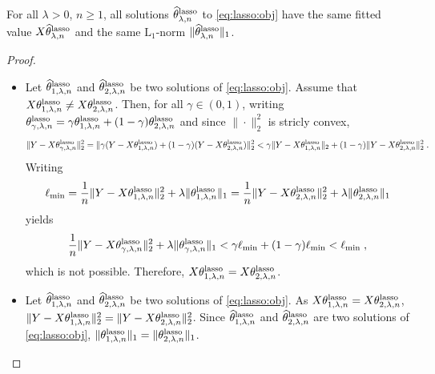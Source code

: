 \begin{lemma}
\label{lem:lasso:loss}
For all $\lambda>0$, $n\geqslant 1$, all solutions $\widehat {\theta}^{\mathrm{lasso}}_{\lambda,n}$ to \eqref{eq:lasso:obj} have the same fitted value $X \widehat {\theta}^{\mathrm{lasso}}_{\lambda,n}$ and the same $\mathrm{L}_1$-norm $\|\widehat {\theta}^{\mathrm{lasso}}_{\lambda,n}\|_1$.
\end{lemma}

\begin{proof}
\begin{itemize}
\item Let $\widehat {\theta}^{\mathrm{lasso}}_{1,\lambda,n}$ and $\widehat {\theta}^{\mathrm{lasso}}_{2,\lambda,n}$ be two solutions of \eqref{eq:lasso:obj}. Assume that $X\theta^{\mathrm{lasso}}_{1,\lambda,n} \neq X\theta^{\mathrm{lasso}}_{2,\lambda,n}$. Then, for all $\gamma\in(0,1)$, writing $\theta^{\mathrm{lasso}}_{\gamma,\lambda,n} = \gamma \theta^{\mathrm{lasso}}_{1,\lambda,n} + (1-\gamma)\theta^{\mathrm{lasso}}_{2,\lambda,n}$ and since $\|\cdot\|_2^2$ is stricly convex, 
$$
\|Y - X\theta^{\mathrm{lasso}}_{\gamma,\lambda,n}\|^2_2 = \|\gamma(Y - X\theta^{\mathrm{lasso}}_{1,\lambda,n}) + (1-\gamma)(Y - X\theta^{\mathrm{lasso}}_{2,\lambda,n})\|^2_2 <  \gamma\|Y - X\theta^{\mathrm{lasso}}_{1,\lambda,n} \|_2 + (1-\gamma)\|Y - X\theta^{\mathrm{lasso}}_{2,\lambda,n}\|^2_2\;.
$$
Writing 
$$
\ell_{\mathrm{min}} = \frac{1}{n}\|Y - X\theta^{\mathrm{lasso}}_{1,\lambda,n}\|_2^2 + \lambda\|\theta^{\mathrm{lasso}}_{1,\lambda,n}\|_1 = \frac{1}{n}\|Y - X\theta^{\mathrm{lasso}}_{2,\lambda,n}\|_2^2 + \lambda\|\theta^{\mathrm{lasso}}_{2,\lambda,n}\|_1
$$
yields
$$
\frac{1}{n}\|Y - X\theta^{\mathrm{lasso}}_{\gamma,\lambda,n}\|_2^2 + \lambda\|\theta^{\mathrm{lasso}}_{\gamma,\lambda,n}\|_1 < \gamma\ell_{\mathrm{min}} + (1-\gamma)\ell_{\mathrm{min}} < \ell_{\mathrm{min}}\;, 
$$
which is not possible. Therefore, $X\theta^{\mathrm{lasso}}_{1,\lambda,n} = X\theta^{\mathrm{lasso}}_{2,\lambda,n}$.
\item Let $\widehat {\theta}^{\mathrm{lasso}}_{1,\lambda,n}$ and $\widehat {\theta}^{\mathrm{lasso}}_{2,\lambda,n}$ be two solutions of \eqref{eq:lasso:obj}. As $X\theta^{\mathrm{lasso}}_{1,\lambda,n} = X\theta^{\mathrm{lasso}}_{2,\lambda,n}$, $\|Y - X\theta^{\mathrm{lasso}}_{1,\lambda,n}\|_2^2 = \|Y - X\theta^{\mathrm{lasso}}_{2,\lambda,n}\|_2^2$. Since $\widehat {\theta}^{\mathrm{lasso}}_{1,\lambda,n}$ and $\widehat {\theta}^{\mathrm{lasso}}_{2,\lambda,n}$ are two solutions of \eqref{eq:lasso:obj}, $\|\theta^{\mathrm{lasso}}_{1,\lambda,n}\|_1=\|\theta^{\mathrm{lasso}}_{2,\lambda,n}\|_1$.
\end{itemize}
\end{proof}

